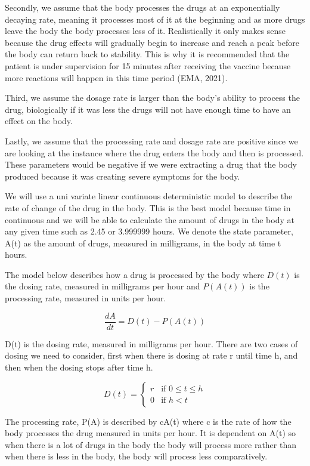\documentclass{article}
\begin{document}
Secondly, we assume that the body processes the drugs at an exponentially decaying rate, meaning it processes most of it at the beginning and as more drugs leave the body the body processes less of it. Realistically it only makes sense because the drug effects will gradually begin to increase and reach a peak before the body can return back to stability. This is why it is recommended that the patient is under supervision for 15 minutes after receiving the vaccine because more reactions will happen in this time period (EMA, 2021). 

Third, we assume the dosage rate is larger than the body's ability to process the drug, biologically if it was less the drugs will not have enough time to have an effect on the body.

Lastly, we assume that the processing rate and dosage rate are positive since we are looking at the instance where the drug enters the body and then is processed. These parameters would be negative if we were extracting a drug that the body produced because it was creating severe symptoms for the body. 

We will use a uni variate linear continuous deterministic model to describe the rate of change of the drug in the body. This is the best model because time in continuous and we will be able to calculate the amount of drugs in the body at any given time such as 2.45 or 3.999999 hours. We denote the state parameter, A(t) as the amount of drugs, measured in milligrams, in the body at time t hours. 

The model below describes how a drug is processed by the body where $D(t)$ is the dosing rate, measured in milligrams per hour and $P(A(t))$ is the processing rate, measured in units per hour. 

$$\frac{dA}{dt} = D(t) - P(A(t)) $$

D(t) is the dosing rate, measured in milligrams per hour. There are two cases of dosing we need to consider, first when there is dosing at rate r until time h, and then when the dosing stops after time h. 

\begin{equation}
  D(t) =
    \begin{cases}
      r & \text{if  $0 \leq t \leq h$}\\
      0 & \text{if $h< t$}
    \end{cases}       
\end{equation}

The processing rate, P(A) is described by cA(t) where c is the rate of how the body processes the drug measured in units per hour. It is dependent on A(t) so when there is a lot of drugs in the body the body will process more rather than when there is less in the body, the body will process less comparatively. 
\end{document}
